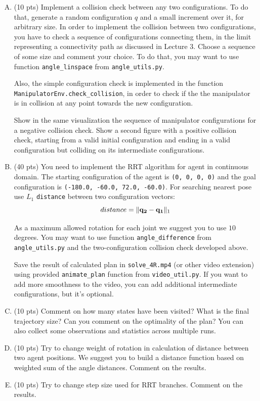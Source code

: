 \documentclass[11pt, oneside, letterpaper]{article}
\begin{document}
\begin{enumerate}[A.]

\item (10 pts) Implement a collision check between any two configurations. To do that, generate a random configuration $q$ and a small increment over it, for arbitrary size.
In order to implement the collision between two configurations, you have to check a sequence of configurations connecting them, in the limit representing a connectivity path as discussed in Lecture 3. Choose a sequence of some size and comment your choice.
To do that, you may want to use function \texttt{angle\_linspace} from \texttt{angle\_utils.py}.

Also, the simple configuration check is implemented in the function \texttt{ManipulatorEnv.check\_collision}, in order to check if the the manipulator is in collision at any point towards the new configuration.

Show in the same visualization the sequence of manipulator configurations for a negative collision check. Show a second figure with a positive collision check, starting from a valid initial configuration and ending in a valid configuration but colliding on its intermediate configurations.


\item (40 pts)
You need to implement the RRT algorithm for agent in continuous domain.
The starting configuration of the agent is \texttt{(0, 0, 0, 0)} and the goal configuration is \texttt{(-180.0, -60.0, 72.0, -60.0)}.
For searching nearest pose use $L_1$ \texttt{distance} between two configuration vectors:
\begin{equation}
    distance = \| \bold{q_2} - \bold{q_1} \|_1
\end{equation}

As a maximum allowed rotation for each joint we suggest you to use $10$ degrees.
You may want to use function \texttt{angle\_difference} from \texttt{angle\_utils.py} and the two-configuration collision check developed above.

Save the result of calculated plan in \texttt{solve\_4R.mp4} (or other video extension) using provided \texttt{animate\_plan} function from \texttt{video\_util.py}. If you want to add more smoothness to the video, you can add additional intermediate configurations, but it's optional.


\item (10 pts)
Comment on how many states have been visited? What is the final trajectory size? Can you comment on the optimality of the plan? You can also collect some observations and statistics across multiple runs.

\item (10 pts)
Try to change weight of rotation in calculation of distance between two agent positions. We suggest you to build a distance function based on weighted sum of the angle distances.
Comment on the results.
\item (10 pts)
Try to change step size used for RRT branches. Comment on the results.
\end{enumerate}
\end{document}
